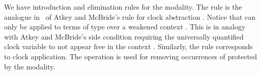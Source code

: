 \begin{AgdaAlign}
We have introduction and elimination
rules for the  modality. The rule  is the analogue in \GTT\ of 
Atkey and McBride's rule for clock abstraction
\cite{atkey2013productive}. Notice that  can only be applied
to terms of type  over a weakened context 
. This is in analogy with Atkey and McBride's side condition
requiring the universally quantified clock variable to not appear free
in the context . Similarly, the rule  corresponds to
clock application. The operation  is used for removing occurrences of  protected by the  modality.
\begin{code}%
%
\>[4]\AgdaSpace{}%
\AgdaSymbol{:}\AgdaSpace{}%
\AgdaSymbol{\{}\AgdaSpace{}%
\AgdaSymbol{:}\AgdaSpace{}%
\AgdaSpace{}%
\AgdaSymbol{\}}\AgdaSpace{}%
\AgdaSymbol{\{}\AgdaSpace{}%
\AgdaSymbol{:}\AgdaSpace{}%
\AgdaSpace{}%
\AgdaSymbol{\}}\AgdaSpace{}%
\AgdaSpace{}%
\AgdaSpace{}%
\AgdaSymbol{(}\AgdaSpace{}%
\AgdaSymbol{)}\AgdaSpace{}%
\AgdaSpace{}%
\AgdaSpace{}%
\AgdaSpace{}%
\AgdaSpace{}%
\AgdaSymbol{(}\AgdaSpace{}%
\AgdaSymbol{)}\<%
\\
%
\>[4]\AgdaSpace{}%
\AgdaSymbol{:}\AgdaSpace{}%
\AgdaSymbol{\{}\AgdaSpace{}%
\AgdaSymbol{:}\AgdaSpace{}%
\AgdaSpace{}%
\AgdaSymbol{\}}\AgdaSpace{}%
\AgdaSymbol{\{}\AgdaSpace{}%
\AgdaSymbol{:}\AgdaSpace{}%
\AgdaSpace{}%
\AgdaSymbol{\}}\AgdaSpace{}%
\AgdaSpace{}%
\AgdaSpace{}%
\AgdaSpace{}%
\AgdaSymbol{(}\AgdaSpace{}%
\AgdaSymbol{)}\AgdaSpace{}%
\AgdaSpace{}%
\AgdaSpace{}%
\AgdaSymbol{(}\AgdaSpace{}%
\AgdaSymbol{)}\AgdaSpace{}%
\<%
\\
%
\>[4]\AgdaSpace{}%
\AgdaSymbol{:}\AgdaSpace{}%
\AgdaSymbol{\{}\AgdaSpace{}%
\AgdaSymbol{:}\AgdaSpace{}%
\AgdaSpace{}%
\AgdaSymbol{\}}\AgdaSpace{}%
\AgdaSymbol{\{}\AgdaSpace{}%
\AgdaSymbol{:}\AgdaSpace{}%
\AgdaSpace{}%
\AgdaSymbol{\}}\AgdaSpace{}%
\AgdaSpace{}%
\AgdaSpace{}%
\AgdaSpace{}%
\AgdaSymbol{(}\AgdaSpace{}%
\AgdaSymbol{(}\AgdaSpace{}%
\AgdaSymbol{))}\AgdaSpace{}%
\AgdaSpace{}%
\AgdaSpace{}%
\AgdaSpace{}%
\AgdaSymbol{(}\AgdaSpace{}%
\AgdaSymbol{)}\<%
\end{code}


\end{AgdaAlign}
